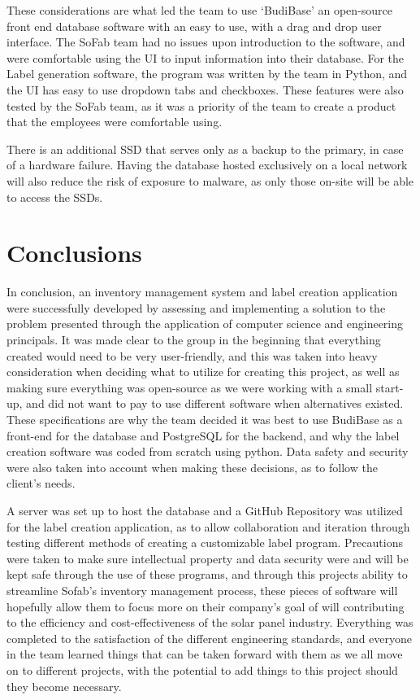 \documentclass{article}
\begin{document}
These considerations are what led the team to use `BudiBase' an open-source front end database software with an easy to use, with 
a drag and drop user interface. The SoFab team had no issues upon introduction to the software, and were comfortable using the UI 
to input information into their database. For the Label generation software, the program was written by the team in Python, and 
the UI has easy to use dropdown tabs and checkboxes. These features were also tested by the SoFab team, as it was a priority of 
the team to create a product that the employees were comfortable using.  

There is an additional SSD that serves only as a backup to the primary, in case of a hardware failure.  Having the database hosted 
exclusively on a local network will also reduce the risk of exposure to malware, as only those on-site will be able to 
access the SSDs.  
\section{Conclusions}
In conclusion, an inventory management system and label creation application were successfully developed by assessing and 
implementing a solution to the problem presented through the application of computer science and engineering principals. 
It was made clear to the group in the beginning that everything created would need to be very user-friendly, and this was taken 
into heavy consideration when deciding what to utilize for creating this project, as well as making sure everything was open-source 
as we were working with a small start-up, and did not want to pay to use different software when alternatives existed. These 
specifications are why the team decided it was best to use BudiBase as a front-end for the database and PostgreSQL for the backend, 
and why the label creation software was coded from scratch using python. Data safety and security were also taken into account 
when making these decisions, as to follow the client’s needs.  

A server was set up to host the database and a GitHub Repository was utilized for the label creation application, 
as to allow collaboration and iteration through testing different methods of creating a customizable label program. 
Precautions were taken to make sure intellectual property and data security were and will be kept safe through the use of these 
programs, and through this projects ability to streamline Sofab’s inventory management process, these pieces of software will 
hopefully allow them to focus more on their company’s goal of will contributing to the efficiency and cost-effectiveness of the 
solar panel industry. Everything was completed to the satisfaction of the different engineering standards, and everyone in the team 
learned things that can be taken forward with them as we all move on to different projects, with the potential to add things to this 
project should they become necessary. 
\end{document}
